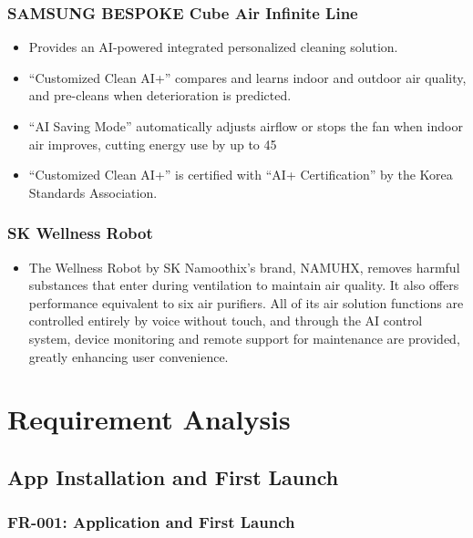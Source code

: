\documentclass[conference]{IEEEtran}
\begin{document}
    \subsubsection{SAMSUNG BESPOKE Cube Air Infinite Line}
        \begin{itemize}
            \item Provides an AI-powered integrated personalized cleaning solution.
            \item “Customized Clean AI+” compares and learns indoor and outdoor air quality, and pre-cleans when deterioration is predicted.
            \item “AI Saving Mode” automatically adjusts airflow or stops the fan when indoor air improves, cutting energy use by up to 45%
            \item “Customized Clean AI+” is certified with “AI+ Certification” by the Korea Standards Association.
        \end{itemize}
    \subsubsection{SK Wellness Robot}
        \begin{itemize}
            \item The Wellness Robot by SK Namoothix’s brand, NAMUHX, removes harmful substances that enter during ventilation to maintain air quality. It also offers performance equivalent to six air purifiers. All of its air solution functions are controlled entirely by voice without touch, and through the AI control system, device monitoring and remote support for maintenance are provided, greatly enhancing user convenience.

        \end{itemize}






\section{Requirement Analysis}

\subsection{\textbf{App Installation and First Launch}}

\subsubsection{FR-001: Application and First Launch}
\end{document}
